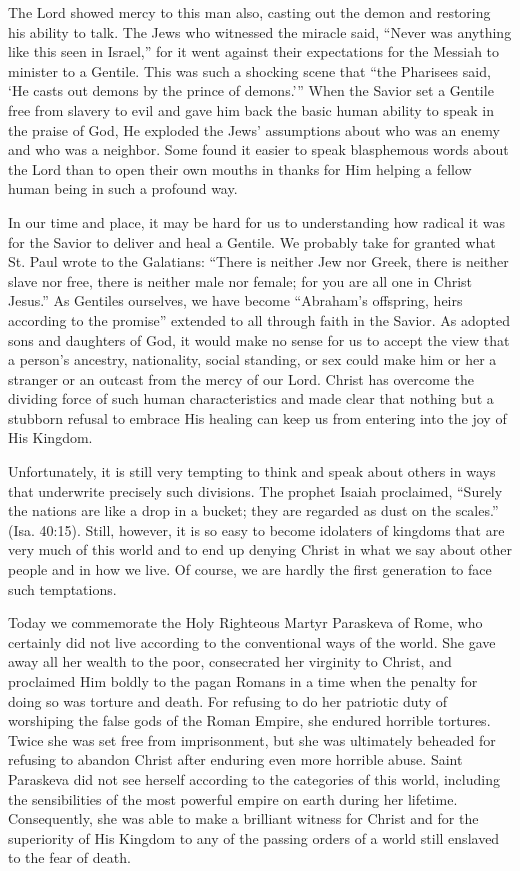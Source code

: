 \documentclass[twoside, letterpaper, 12pt]{report}
\begin{document}
\begin{maybetwocolumns}
The Lord showed mercy to this man also, casting out the demon and restoring his ability to talk.
The Jews who witnessed the miracle said, “Never was anything like this seen in Israel,” for it went
against their expectations for the Messiah to minister to a Gentile. This was such a shocking scene
that “the Pharisees said, ‘He casts out demons by the prince of demons.’” When the Savior set a
Gentile free from slavery to evil and gave him back the basic human ability to speak in the praise
of God, He exploded the Jews’ assumptions about who was an enemy and who was a neighbor. Some found
it easier to speak blasphemous words about the Lord than to open their own mouths in thanks for Him
helping a fellow human being in such a profound way.

In our time and place, it may be hard for us to understanding how radical it was for the Savior to
deliver and heal a Gentile. We probably take for granted what St. Paul wrote to the Galatians:
“There is neither Jew nor Greek, there is neither slave nor free, there is neither male nor female;
for you are all one in Christ Jesus.” As Gentiles ourselves, we have become “Abraham’s offspring,
heirs according to the promise” extended to all through faith in the Savior. As adopted sons and
daughters of God, it would make no sense for us to accept the view that a person’s ancestry,
nationality, social standing, or sex could make him or her a stranger or an outcast from the mercy
of our Lord. Christ has overcome the dividing force of such human characteristics and made clear
that nothing but a stubborn refusal to embrace His healing can keep us from entering into the joy of
His Kingdom.

Unfortunately, it is still very tempting to think and speak about others in ways that underwrite
precisely such divisions. The prophet Isaiah proclaimed, “Surely the nations are like a drop in a
bucket; they are regarded as dust on the scales.” (Isa. 40:15). Still, however, it is so easy to
become idolaters of kingdoms that are very much of this world and to end up denying Christ in what
we say about other people and in how we live. Of course, we are hardly the first generation to face
such temptations.

Today we commemorate the Holy Righteous Martyr Paraskeva of Rome, who certainly did not live
according to the conventional ways of the world. She gave away all her wealth to the poor,
consecrated her virginity to Christ, and proclaimed Him boldly to the pagan Romans in a time when
the penalty for doing so was torture and death. For refusing to do her patriotic duty of
worshiping the false gods of the Roman Empire, she endured horrible tortures. Twice she was set
free from imprisonment, but she was ultimately beheaded for refusing to abandon Christ after
enduring even more horrible abuse. Saint Paraskeva did not see herself according to the categories
of this world, including the sensibilities of the most powerful empire on earth during her lifetime.
Consequently, she was able to make a brilliant witness for Christ and for the superiority of His
Kingdom to any of the passing orders of a world still enslaved to the fear of death.


\end{maybetwocolumns}
\end{document}

